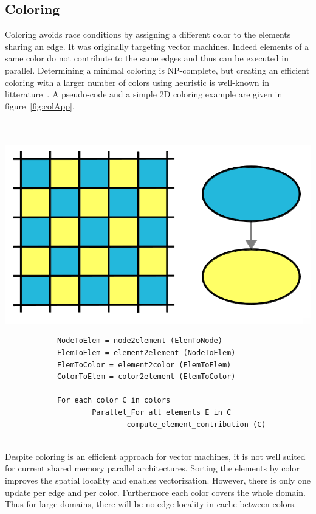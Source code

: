\documentclass{IOS-Book-Article}
\begin{document}
\subsection{Coloring}
\label{sec:col}
Coloring avoids race conditions by assigning a different color to the elements sharing an edge.
It was originally targeting vector machines. Indeed elements of a same color do not contribute to the same edges and thus can be executed in parallel.
Determining a minimal coloring is NP-complete, but creating an efficient coloring with a larger number of colors using heuristic is well-known in litterature~\cite{CPUfe}.
A pseudo-code and a simple 2D coloring example are given in figure~\ref{fig:colApp}.
~\\~\\~\\
{
\begin{minipage}[tp]{0.34\textwidth}
	\includegraphics[scale=0.15]{Coloring_approach.png}
\end{minipage}
\begin{minipage}[tp]{0.55\textwidth}
 		\small
 		\begin{verbatim}
			NodeToElem = node2element (ElemToNode)
			ElemToElem = element2element (NodeToElem)
			ElemToColor = element2color (ElemToElem)
			ColorToElem = color2element (ElemToColor)

			For each color C in colors
    				Parallel_For all elements E in C
        					compute_element_contribution (C)
 		\end{verbatim}
 \end{minipage}	
 }
 ~\\
Despite coloring is an efficient approach for vector machines, it is not well suited for current shared memory parallel architectures.
Sorting the elements by color improves the spatial locality and enables vectorization.
However, there is only one update per edge and per color. Furthermore each color covers the whole domain.
Thus for large domains, there will be no edge locality in cache between colors.
\end{document}
